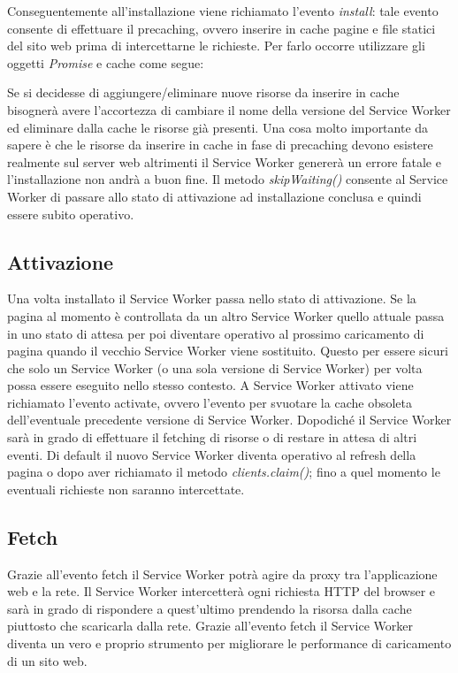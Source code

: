 \documentclass[11pt ,a4paper , twoside , openright ]{book}
\begin{document}
	Conseguentemente all’installazione viene richiamato l’evento \textit{install}: tale evento consente di effettuare il precaching, ovvero inserire in cache pagine e file statici del sito web prima di intercettarne le richieste. Per farlo occorre utilizzare gli oggetti \textit{Promise} e cache come segue:
	\pagebreak
	
	Se si decidesse di aggiungere/eliminare nuove risorse da inserire in cache bisognerà avere l’accortezza di cambiare il nome della versione del Service Worker ed eliminare dalla cache le risorse già presenti.
	Una cosa molto importante da sapere è che le risorse da inserire in cache in fase di precaching devono esistere realmente sul server web altrimenti il Service Worker genererà un errore fatale e l’installazione non andrà a buon fine. 
	Il metodo \textit{skipWaiting()} consente al Service Worker di passare allo stato di attivazione ad installazione conclusa e quindi essere subito operativo.
	
	\subsection{Attivazione}
	Una volta installato il Service Worker passa nello stato di attivazione. Se la pagina al momento è controllata da un altro Service Worker quello attuale passa in uno stato di attesa per poi diventare operativo al prossimo caricamento di pagina quando il vecchio Service Worker viene sostituito.
	Questo per essere sicuri che solo un Service Worker (o una sola versione di Service Worker) per volta possa essere eseguito nello stesso contesto.
	A Service Worker attivato viene richiamato l’evento activate, ovvero l'evento per svuotare la cache obsoleta dell’eventuale precedente versione di Service Worker. Dopodiché il Service Worker sarà in grado di effettuare il fetching di risorse o di restare in attesa di altri eventi.
	Di default il nuovo Service Worker diventa operativo al refresh della pagina o dopo aver richiamato il metodo \textit{clients.claim()}; fino a quel momento le eventuali richieste non saranno intercettate. 
	
	\subsection{Fetch}
	Grazie all’evento fetch il Service Worker potrà agire da proxy tra l’applicazione web e la rete.
	Il Service Worker intercetterà ogni richiesta HTTP del browser e sarà in grado di rispondere a quest’ultimo prendendo la risorsa dalla cache piuttosto che scaricarla dalla rete.
	Grazie all’evento fetch il Service Worker diventa un vero e proprio strumento per migliorare le performance di caricamento di un sito web.
	
\end{document}
